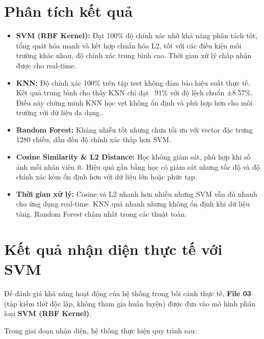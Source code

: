 \documentclass[a4paper]{book}
\begin{document}
\section{Phân tích kết quả}
\begin{itemize}
    \item \textbf{SVM (RBF Kernel):} Đạt 100\% độ chính xác nhờ khả năng phân tách tốt, tổng quát hóa mạnh và kết hợp chuẩn hóa L2, tốt với các điều kiện môi trường khác nhau, độ chính xác trung bình cao. Thời gian xử lý chấp nhận được cho real-time.
    
    \item \textbf{KNN:} Độ chính xác 100\% trên tập test không đảm bảo hiệu suất thực tế. Kết quả trung bình cho thấy KNN chỉ đạt ~91\% với độ lệch chuẩn ±8.57\%. Điều này chứng minh KNN học vẹt không ổn định và phù hợp hơn cho môi trường với dữ liệu đa dạng..
    
    \item \textbf{Random Forest:} Kháng nhiễu tốt nhưng chưa tối ưu với vector đặc trưng 1280 chiều, dẫn đến độ chính xác thấp hơn SVM.
    
    \item \textbf{Cosine Similarity \& L2 Distance:} Học không giám sát, phù hợp khi số ảnh mỗi nhân viên ít. Hiệu quả gần bằng học có giám sát nhưng tốc độ và độ chính xác kém ổn định hơn với dữ liệu lớn hoặc phức tạp.
    
    \item \textbf{Thời gian xử lý:} Cosine và L2 nhanh hơn nhiều nhưng SVM vẫn đủ nhanh cho ứng dụng real-time. KNN quá nhanh nhưng không ổn định khi dữ liệu tăng. Random Forest chậm nhất trong các thuật toán.
\end{itemize}
\section{Kết quả nhận diện thực tế với SVM}

Để đánh giá khả năng hoạt động của hệ thống trong bối cảnh thực tế, \textbf{File 03} (tập kiểm thử độc lập, không tham gia huấn luyện) được đưa vào mô hình phân loại \textbf{SVM (RBF Kernel)}. 

Trong giai đoạn nhận diện, hệ thống thực hiện quy trình sau:
\end{document}
